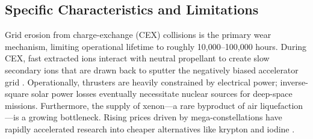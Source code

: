 \subsection{Specific Characteristics and Limitations}

Grid erosion from charge-exchange (CEX) collisions is the primary wear mechanism, limiting operational lifetime to roughly 10,000--100,000 hours. During CEX, fast extracted ions interact with neutral propellant to create slow secondary ions that are drawn back to sputter the negatively biased accelerator grid \cite{holste_2020}. Operationally, thrusters are heavily constrained by electrical power; inverse-square solar power losses eventually necessitate nuclear sources for deep-space missions. Furthermore, the supply of xenon—a rare byproduct of air liquefaction—is a growing bottleneck. Rising prices driven by mega-constellations have rapidly accelerated research into cheaper alternatives like krypton and iodine \cite{holste_2020, dietz_2019}.

